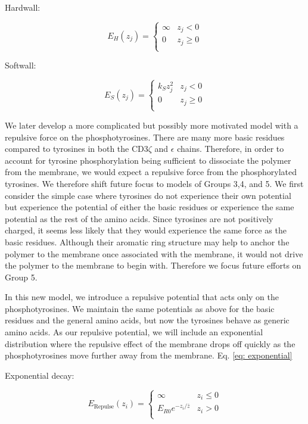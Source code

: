 \documentclass[../../AdvancementSummary.tex]{subfiles}
\begin{document}
Hardwall:

\begin{equation}\label{eq: hardwall}
E_H(z_j) = 
\begin{cases}
\infty 	& z_j < 0\\
0 & z_j \geq 0 \\
\end{cases}
\end{equation}


Softwall:

\begin{equation}\label{eq: softwall}
E_S(z_j) = 
\begin{cases}
k_Sz_j^2 	& z_j < 0\\
0 & z_j \geq 0 \\
\end{cases}
\end{equation}

We later develop a more complicated but possibly more motivated model with a repulsive force on the phosphotyrosines. There are many more basic residues compared to tyrosines in both the CD3$\zeta$ and $\epsilon$ chains.  Therefore, in order to account for tyrosine phosphorylation being sufficient to dissociate the polymer from the membrane, we would expect a repulsive force from the phosphorylated tyrosines. We therefore shift future focus to models of Groups 3,4, and 5. We first consider the simple case where tyrosines do not experience their own potential but experience the potential of either the basic residues or experience the same potential as the rest of the amino acids.  Since tyrosines are not positively charged, it seems less likely that they would experience the same force as the basic residues.  Although their aromatic ring structure may help to anchor the polymer to the membrane once associated with the membrane, it would not drive the polymer to the membrane to begin with. \cite{Lopez2015} Therefore we focus future efforts on Group 5.

In this new model, we introduce a repulsive potential that acts only on the phosphotyrosines. We maintain the same potentials as above for the basic residues and the general amino acids, but now the tyrosines behave as generic amino acids. As our repulsive potential, we will include an exponential distribution where the repulsive effect of the membrane drops off quickly as the phosphotyrosines move further away from the membrane. Eq. \ref{eq: exponential}

Exponential decay:

\begin{equation}\label{eq: exponential}
E_{\text{Repulse}}(z_i) = 
\begin{cases}
\infty	& z_i \leq 0\\
E_{R0}e^{-z_i/\bar{z}} & z_i > 0 \\
\end{cases}
\end{equation}
\end{document}
